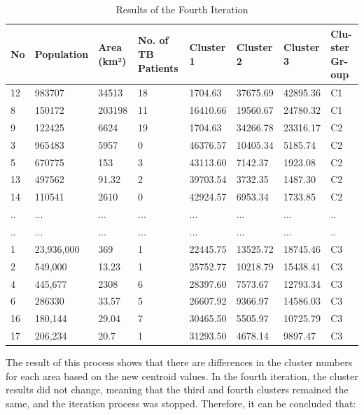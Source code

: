 \documentclass[conference]{IEEEtran}
\begin{document}
\begin{table}[H]
    \centering
    \begin{tabular}{|p{.1cm}|p{1.1cm}|p{.7cm}|p{0.50cm}|p{0.85cm}|p{0.85cm}|p{1cm}|p{0.4cm}|}
    \hline
    \textbf{No} & \textbf{Population} & \textbf{Area (km²)} & \textbf{No. of TB Patients} & \textbf{Cluster 1} & \textbf{Cluster 2} & \textbf{Cluster 3} & \textbf{Clu- ster Gr- oup} \\ \hline
    12 & 983707 & 34513 & 18 & 1704.63 & 37675.69 & 42895.36 & C1 \\ \hline
    8 & 150172 & 203198 & 11 & 16410.66 & 19560.67 & 24780.32 & C1 \\ \hline
    9 & 122425 & 6624 & 19 & 1704.63 & 34266.78 & 23316.17 & C2 \\ \hline
    3 & 965483 & 5957 & 0 & 46376.57 & 10405.34 & 5185.74 & C2 \\ \hline
    5 & 670775 & 153 & 3 & 43113.60 & 7142.37 & 1923.08 & C2 \\ \hline
    13 & 497562 & 91.32 & 2 & 39703.54 & 3732.35 & 1487.30 & C2 \\ \hline
    14 & 110541 & 2610 & 0 & 42924.57 & 6953.34 & 1733.85 & C2 \\ \hline
    .. & ... & ... & ... & ... & ... & ... & .. \\ \hline
    .. & ... & ... & ... & ... & ... & ... & .. \\ \hline
    1 & 23,936,000 & 369 & 1 & 22445.75 & 13525.72 & 18745.46 & C3 \\ \hline
    2 & 549,000 & 13.23 & 1 & 25752.77 & 10218.79 & 15438.41 & C3 \\ \hline
    4 & 445,677 & 2308 & 6 & 28397.60 & 7573.67 & 12793.34 & C3 \\ \hline
    6 & 286330 & 33.57 & 5 & 26607.92 & 9366.97 & 14586.03 & C3 \\ \hline
    16 & 180,144 & 29.04 & 7 & 30465.50 & 5505.97 & 10725.79 & C3 \\ \hline
    17 & 206,234 & 20.7 & 1 & 31293.50 & 4678.14 & 9897.47 & C3 \\ \hline
    \end{tabular}
    \caption{Results of the Fourth Iteration}
    \label{tab:my_label2}
    \end{table}

     The result of this process shows that there are differences in the cluster numbers for each area based on the new centroid values. In the fourth iteration, the cluster results did not change, meaning that the third and fourth clusters remained the same, and the iteration process was stopped. Therefore, it can be concluded that:
\end{document}
